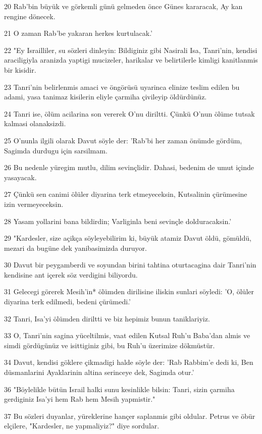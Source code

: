 \par 20 Rab'bin büyük ve görkemli günü gelmeden önce Günes kararacak, Ay kan rengine dönecek.
\par 21 O zaman Rab'be yakaran herkes kurtulacak.'
\par 22 "Ey Israilliler, su sözleri dinleyin: Bildiginiz gibi Nasirali Isa, Tanri'nin, kendisi araciligiyla aranizda yaptigi mucizeler, harikalar ve belirtilerle kimligi kanitlanmis bir kisidir.
\par 23 Tanri'nin belirlenmis amaci ve öngörüsü uyarinca elinize teslim edilen bu adami, yasa tanimaz kisilerin eliyle çarmiha çivileyip öldürdünüz.
\par 24 Tanri ise, ölüm acilarina son vererek O'nu diriltti. Çünkü O'nun ölüme tutsak kalmasi olanaksizdi.
\par 25 O'nunla ilgili olarak Davut söyle der: 'Rab'bi her zaman önümde gördüm, Sagimda durdugu için sarsilmam.
\par 26 Bu nedenle yüregim mutlu, dilim sevinçlidir. Dahasi, bedenim de umut içinde yasayacak.
\par 27 Çünkü sen canimi ölüler diyarina terk etmeyeceksin, Kutsalinin çürümesine izin vermeyeceksin.
\par 28 Yasam yollarini bana bildirdin; Varliginla beni sevinçle dolduracaksin.'
\par 29 "Kardesler, size açikça söyleyebilirim ki, büyük atamiz Davut öldü, gömüldü, mezari da bugüne dek yanibasimizda duruyor.
\par 30 Davut bir peygamberdi ve soyundan birini tahtina oturtacagina dair Tanri'nin kendisine ant içerek söz verdigini biliyordu.
\par 31 Gelecegi görerek Mesih'in* ölümden dirilisine iliskin sunlari söyledi: 'O, ölüler diyarina terk edilmedi, bedeni çürümedi.'
\par 32 Tanri, Isa'yi ölümden diriltti ve biz hepimiz bunun taniklariyiz.
\par 33 O, Tanri'nin sagina yüceltilmis, vaat edilen Kutsal Ruh'u Baba'dan almis ve simdi gördügünüz ve isittiginiz gibi, bu Ruh'u üzerimize dökmüstür.
\par 34 Davut, kendisi göklere çikmadigi halde söyle der: 'Rab Rabbim'e dedi ki, Ben düsmanlarini Ayaklarinin altina serinceye dek, Sagimda otur.'
\par 36 "Böylelikle bütün Israil halki sunu kesinlikle bilsin: Tanri, sizin çarmiha gerdiginiz Isa'yi hem Rab hem Mesih yapmistir."
\par 37 Bu sözleri duyanlar, yüreklerine hançer saplanmis gibi oldular. Petrus ve öbür elçilere, "Kardesler, ne yapmaliyiz?" diye sordular.
